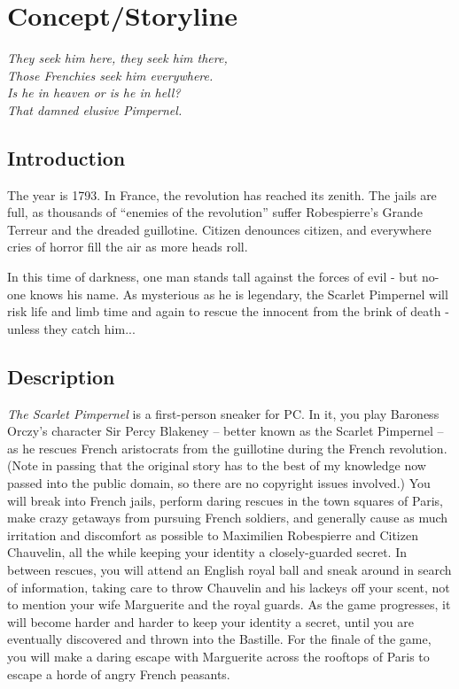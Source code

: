 \chapter{Concept/Storyline}

\begin{center}
\emph{
They seek him here, they seek him there, \\
Those Frenchies seek him everywhere. \\
Is he in heaven or is he in hell? \\
That damned elusive Pimpernel.
}
\end{center}

\section{Introduction}

The year is 1793. In France, the revolution has reached its zenith. The jails are full, as thousands of ``enemies of the revolution'' suffer Robespierre's Grande Terreur and the dreaded guillotine. Citizen denounces citizen, and everywhere cries of horror fill the air as more heads roll.

In this time of darkness, one man stands tall against the forces of evil - but no-one knows his name. As mysterious as he is legendary, the Scarlet Pimpernel will risk life and limb time and again to rescue the innocent from the brink of death - unless they catch him...

\section{Description}

\emph{The Scarlet Pimpernel} is a first-person sneaker for PC. In it, you play Baroness Orczy's character Sir Percy Blakeney -- better known as the Scarlet Pimpernel -- as he rescues French aristocrats from the guillotine during the French revolution. (Note in passing that the original story has to the best of my knowledge now passed into the public domain, so there are no copyright issues involved.) You will break into French jails, perform daring rescues in the town squares of Paris, make crazy getaways from pursuing French soldiers, and generally cause as much irritation and discomfort as possible to Maximilien Robespierre and Citizen Chauvelin, all the while keeping your identity a closely-guarded secret. In between rescues, you will attend an English royal ball and sneak around in search of information, taking care to throw Chauvelin and his lackeys off your scent, not to mention your wife Marguerite and the royal guards. As the game progresses, it will become harder and harder to keep your identity a secret, until you are eventually discovered and thrown into the Bastille. For the finale of the game, you will make a daring escape with Marguerite across the rooftops of Paris to escape a horde of angry French peasants.

